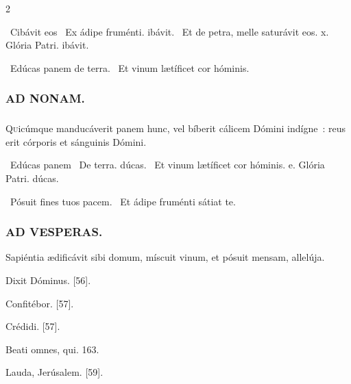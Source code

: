 \documentclass[9pt,twoside]{extarticle}
\begin{document}
\begin{multicols}{2}
\begin{tightlist}{}
\item {}~Cibávit eos \textred{*}~Ex ádipe fruménti. ibávit. ~Et de petra, melle saturávit eos. x. Glória Patri. ibávit.
\item {}~Edúcas panem de terra. ~Et vinum lætíficet cor hóminis.
\end{tightlist}

\subsubsection*{\center \textsc{AD NONAM.}}
\subsubsection*{}
\lettrine{Q}uicúmque manducáverit panem hunc, vel bíberit cálicem Dómini indígne~: reus erit córporis et sánguinis Dómini.

\begin{tightlist}{}
\item {}~Edúcas panem \textred{*}~De terra. dúcas. ~Et vinum lætíficet cor hóminis. e. Glória Patri. dúcas.
\item {}~Pósuit fines tuos pacem. ~Et ádipe fruménti sátiat te.
\end{tightlist}

\subsubsection*{\center \textsc{AD VESPERAS.}}
\begin{tightlist}{}
\item {} Sapiéntia ædificávit sibi domum, míscuit vinum, et pósuit mensam, allelúja.
\item {} Dixit Dóminus. [56]. 
\item {} Confitébor. [57]. 
\item {} Crédidi. [57]. 
\item {} Beati omnes, qui. 163. 
\item {} Lauda, Jerúsalem. [59].
\end{tightlist}


\end{multicols}
\end{document}
